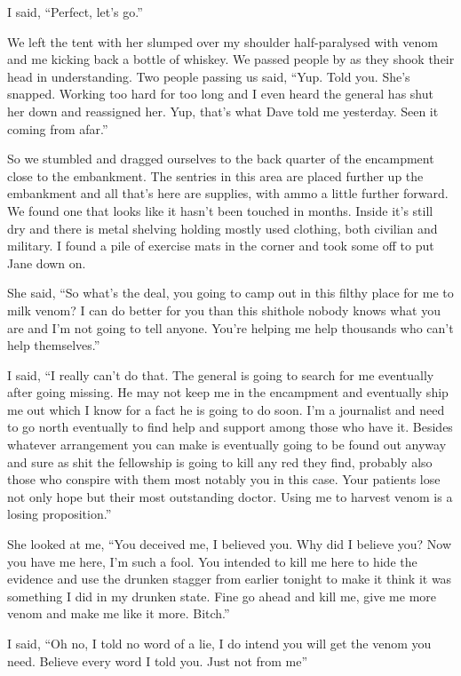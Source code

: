 I said, ``Perfect, let's go.''

We left the tent with her slumped over my shoulder half-paralysed with venom and me kicking back a bottle of whiskey. We passed people by as they shook their head in understanding. Two people passing us said, ``Yup. Told you. She's snapped. Working too hard for too long and I even heard the general has shut her down and reassigned her. Yup, that's what Dave told me yesterday. Seen it coming from afar.''

So we stumbled and dragged ourselves to the back quarter of the encampment close to the embankment. The sentries in this area are placed further up the embankment and all that's here are supplies, with ammo a little further forward. We found one that looks like it hasn't been touched in months. Inside it's still dry and there is metal shelving holding mostly used clothing, both civilian and military. I found a pile of exercise mats in the corner and took some off to put Jane down on.

She said, ``So what's the deal, you going to camp out in this filthy place for me to milk venom? I can do better for you than this shithole nobody knows what you are and I'm not going to tell anyone. You're helping me help thousands who can't help themselves.''

I said, ``I really can't do that. The general is going to search for me eventually after going missing. He may not keep me in the encampment and eventually ship me out which I know for a fact he is going to do soon. I'm a journalist and need to go north eventually to find help and support among those who have it. Besides whatever arrangement you can make is eventually going to be found out anyway and sure as shit the fellowship is going to kill any red they find, probably also those who conspire with them most notably you in this case. Your patients lose not only hope but their most outstanding doctor. Using me to harvest venom is a losing proposition.''

She looked at me, ``You deceived me, I believed you. Why did I believe you? Now you have me here, I'm such a fool. You intended to kill me here to hide the evidence and use the drunken stagger from earlier tonight to make it think it was something I did in my drunken state. Fine go ahead and kill me, give me more venom and make me like it more. Bitch.''

I said, ``Oh no, I told no word of a lie, I do intend you will get the venom you need. Believe every word I told you. Just not from me''

